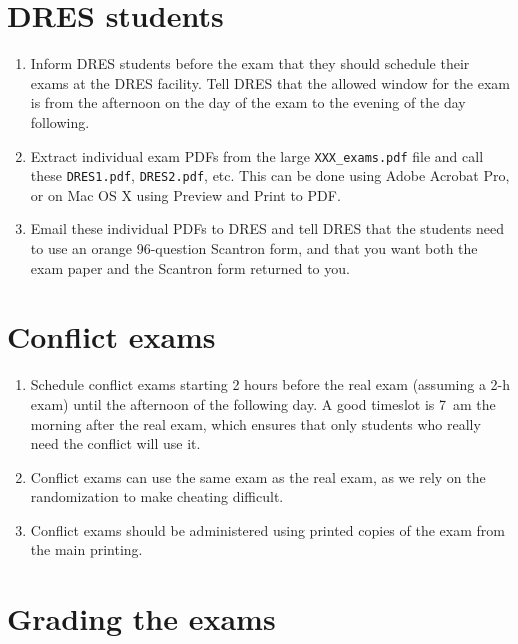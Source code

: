 \documentclass{article}
\begin{document}
\section{DRES students}

\begin{enumerate}
\item Inform DRES students before the exam that they should schedule
  their exams at the DRES facility. Tell DRES that the allowed window
  for the exam is from the afternoon on the day of the exam to the
  evening of the day following.
\item Extract individual exam PDFs from the large
  \texttt{XXX_exams.pdf} file and call these \texttt{DRES1.pdf},
  \texttt{DRES2.pdf}, etc. This can be done using Adobe Acrobat Pro,
  or on Mac OS X using Preview and Print to PDF.
\item Email these individual PDFs to DRES and tell DRES that the
  students need to use an orange 96-question Scantron form, and that
  you want both the exam paper and the Scantron form returned to you.
\end{enumerate}

\section{Conflict exams}

\begin{enumerate}
\item Schedule conflict exams starting 2 hours before the real exam
  (assuming a 2-h exam) until the afternoon of the following day. A
  good timeslot is 7~am the morning after the real exam, which ensures
  that only students who really need the conflict will use it.
\item Conflict exams can use the same exam as the real exam, as we
  rely on the randomization to make cheating difficult.
\item Conflict exams should be administered using printed copies of
  the exam from the main printing.
\end{enumerate}

\section{Grading the exams}
\end{document}
